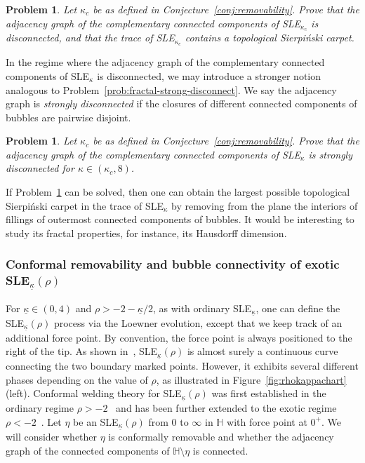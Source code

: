 \documentclass[a4paper]{article}
\numberwithin{equation}{section}
\newtheorem{prob}[theorem]{\bf Problem}
\numberwithin{equation}{section}
\renewcommand{\1}{\mathbf{1}}
\begin{document}
\begin{prob}
    Let $\kappa_c$ be as defined in Conjecture~\ref{conj:removability}. Prove that the adjacency graph of the complementary connected components of SLE$_{\kappa_c}$ is disconnected, and that the trace of SLE$_{\kappa_c}$ contains a topological Sierpi\'nski carpet.
\end{prob}

In the regime where the adjacency graph of the complementary connected components of SLE$_\kappa$ is disconnected, we may introduce a stronger notion analogous to Problem~\ref{prob:fractal-strong-disconnect}. We say the adjacency graph is \emph{strongly disconnected} if the closures of different connected components of bubbles are pairwise disjoint.

\begin{prob}\label{prob:sle-strong-disconnect}
    Let $\kappa_c$ be as defined in Conjecture~\ref{conj:removability}. Prove that the adjacency graph of the complementary connected components of SLE$_\kappa$ is strongly disconnected for $\kappa \in (\kappa_c, 8)$.
\end{prob}

If Problem~\ref{prob:sle-strong-disconnect} can be solved, then one can obtain the largest possible topological Sierpi\'nski carpet in the trace of SLE$_\kappa$ by removing from the plane the interiors of fillings of outermost connected components of bubbles. It would be interesting to study its fractal properties, for instance, its Hausdorff dimension.

\subsubsection*{Conformal removability and bubble connectivity of exotic SLE$_{\underline{\kappa}}(\rho)$}

For $\underline{\kappa} \in (0,4)$ and $\rho > -2 - \underline{\kappa}/2$, as with ordinary SLE$_{\underline{\kappa}}$, one can define the SLE$_{\underline{\kappa}}(\rho)$ process via the Loewner evolution, except that we keep track of an additional force point. By convention, the force point is always positioned to the right of the tip. As shown in~\cite{IG1, MS-light-cone, CLEpercolation}, SLE$_{\underline{\kappa}}(\rho)$ is almost surely a continuous curve connecting the two boundary marked points. However, it exhibits several different phases depending on the value of $\rho$, as illustrated in Figure~\ref{fig:rhokappachart} (left). Conformal welding theory for SLE$_{\underline{\kappa}}(\rho)$ was first established in the ordinary regime $\rho>-2$~\cite{Sheffield-zipper, DMS21-LQG-MRT} and has been further extended to the exotic regime $\rho<-2$~\cite{MSW22-simple-CLE-LQG,KM24-SLE-light-cone-LQG}. Let $\eta$ be an SLE$_{\underline{\kappa}}(\rho)$ from 0 to $\infty$ in $\mathbb{H}$ with force point at $0^+$. We will consider whether $\eta$ is conformally removable and whether the adjacency graph of the connected components of $\mathbb{H} \setminus \eta$ is connected.
\end{document}
